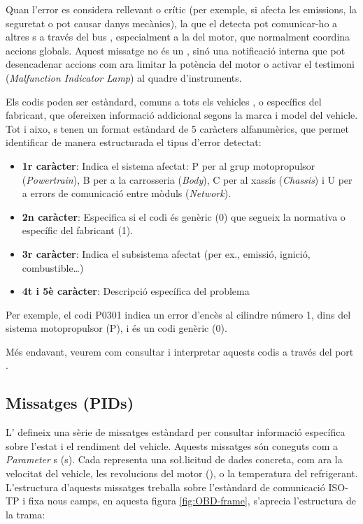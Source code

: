 \documentclass{tfgitic}[2024/07/01]
\begin{document}
Quan l'error es considera rellevant o crític (per exemple, si afecta les emissions, la seguretat o pot causar danys mecànics), la  que el detecta pot 
comunicar-ho a altres s a través del bus , especialment a la  del motor, que normalment coordina accions globals. Aquest missatge no és un , 
sinó una notificació interna que pot desencadenar accions com ara limitar la potència del motor o activar el testimoni  (\textit{Malfunction Indicator Lamp}) 
al quadre d'instruments.

Els codis  poden ser estàndard, comuns a tots els vehicles , o específics del fabricant, que ofereixen informació addicional segons la marca i model del vehicle.
Tot i aixo, s tenen un format estàndard de 5 caràcters alfanumèrics, que permet identificar de manera estructurada el tipus d'error detectat:

\begin{itemize}
  \item \textbf{1r caràcter}: Indica el sistema afectat: P per al grup motopropulsor (\textit{Powertrain}), B per a la carrosseria (\textit{Body}), C per al xassís (\textit{Chassis}) i 
  U per a errors de comunicació entre mòduls (\textit{Network}). 
  
  \item \textbf{2n caràcter}: Especifica si el codi és genèric (0) que segueix la normativa o específic del fabricant (1).
  
  \item \textbf{3r caràcter}: Indica el subsistema afectat (per ex., emissió, ignició, combustible…)
  
  \item \textbf{4t i 5è caràcter}: Descripció específica del problema
\end{itemize} 

Per exemple, el codi P0301 indica un error d'encès al cilindre número 1, dins del sistema motopropulsor (P), i és un codi genèric (0).

Més endavant, veurem com consultar i interpretar aquests codis  a través del port .

\subsection{Missatges (PIDs)}

L' defineix una sèrie de missatges estàndard per consultar informació específica sobre l'estat i el rendiment del vehicle. Aquests missatges 
són coneguts com a \textit{Parameter} s (s). Cada  representa una so\l.licitud de dades concreta, com ara la velocitat del vehicle, les revolucions del 
motor (), o la temperatura del refrigerant. L'estructura d'aquests missatges treballa sobre l'estàndard de comunicació ISO-TP i fixa nous camps, 
en aquesta figura \ref{fig:OBD-frame}, s'aprecia l'estructura de la trama:
\end{document}
